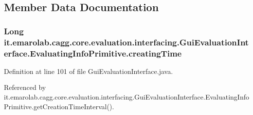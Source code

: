 \subsection{Member Data Documentation}
\hypertarget{classit_1_1emarolab_1_1cagg_1_1core_1_1evaluation_1_1interfacing_1_1GuiEvaluationInterface_1_1EvaluatingInfoPrimitive_ac3fe44ddfa4450a6c8f6f2055b07d499}{
\subsubsection[{creating\-Time}]{\setlength{\rightskip}{0pt plus 5cm}Long it.\-emarolab.\-cagg.\-core.\-evaluation.\-interfacing.\-Gui\-Evaluation\-Interface.\-Evaluating\-Info\-Primitive.\-creating\-Time\hspace{0.3cm}{\ttfamily [private]}}}\label{classit_1_1emarolab_1_1cagg_1_1core_1_1evaluation_1_1interfacing_1_1GuiEvaluationInterface_1_1EvaluatingInfoPrimitive_ac3fe44ddfa4450a6c8f6f2055b07d499}


Definition at line 101 of file Gui\-Evaluation\-Interface.\-java.



Referenced by it.\-emarolab.\-cagg.\-core.\-evaluation.\-interfacing.\-Gui\-Evaluation\-Interface.\-Evaluating\-Info\-Primitive.\-get\-Creation\-Time\-Interval().


